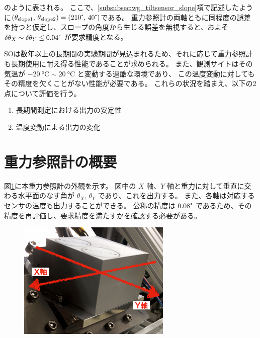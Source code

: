 \documentclass[../../main.tex]{subfiles}
\begin{document}
のように表される。
ここで、\ref{subsubsec:wg_tiltsensor_slope}項で記述したように$(\theta_{\mathrm{slope}1},\,\theta_{\mathrm{slope}2}) = (210\tcdegree,\,40\tcdegree)$である。
重力参照計の両軸ともに同程度の誤差を持つと仮定し、スロープの角度から生じる誤差を無視すると、およそ $\delta\theta_{X} \sim \delta\theta_{Y} \leq 0.04\tcdegree$ が要求精度となる。

SOは数年以上の長期間の実験期間が見込まれるため、それに応じて重力参照計も長期使用に耐え得る性能であることが求められる。
また、観測サイトはその気温が $\SI{-20}{\degreeCelsius} \sim \SI{20}{\degreeCelsius}$ と変動する過酷な環境であり、
この温度変動に対してもその精度を欠くことがない性能が必要である。
これらの状況を踏まえ、以下の2点について評価を行う。
\begin{enumerate}
    \item 長期間測定における出力の安定性
    \item 温度変動による出力の変化
\end{enumerate}

\section{重力参照計の概要}
図\ref{fig:tiltsensor_DSIC-2051-60}に本重力参照計の外観を示す。
図中の $X$ 軸、$Y$ 軸と重力に対して垂直に交わる水平面のなす角が $\theta_{X},\,\theta_{Y}$ であり、これを出力する。
また、各軸は対応するセンサの温度も出力することができる。
公称の精度は $0.08\tcdegree$ であるため、その精度を再評価し、要求精度を満たすかを確認する必要がある。
\begin{figure}[H]
    \centering
    \includegraphics[width=0.65\textwidth]{tiltsensor/tiltsensor_overview.pdf}
    \label{fig:tiltsensor_DSIC-2051-60}
\end{figure}
\end{document}
